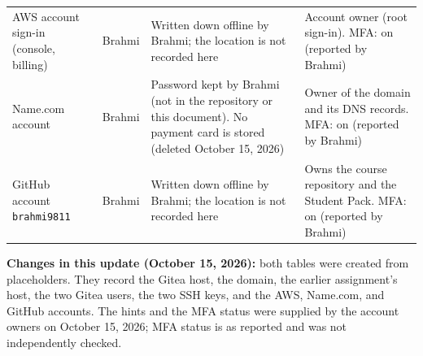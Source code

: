 \begin{tabularx}{\linewidth}{L{3.0cm}L{1.8cm}YL{3.2cm}}
AWS account sign-in (console, billing) & Brahmi & Written down offline by Brahmi; the location is not recorded here & Account owner (root sign-in). MFA: on (reported by Brahmi)\\
Name.com account & Brahmi & Password kept by Brahmi (not in the repository or this document). No payment card is stored (deleted October 15, 2026) & Owner of the domain and its DNS records. MFA: on (reported by Brahmi)\\
GitHub account \texttt{brahmi9811} & Brahmi & Written down offline by Brahmi; the location is not recorded here & Owns the course repository and the Student Pack. MFA: on (reported by Brahmi)\\
\end{tabularx}
\textbf{Changes in this update (October 15, 2026):} both tables were created from
placeholders. They record the Gitea host, the domain, the earlier assignment's
host, the two Gitea users, the two SSH keys, and the AWS, Name.com, and GitHub
accounts. The hints and the MFA status were supplied by the account owners on October 15, 2026; MFA status is as reported and was not independently checked.

